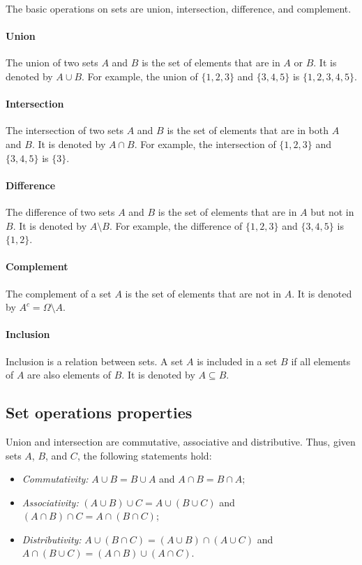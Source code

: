 The basic operations on sets are union, intersection, difference, and complement.

\paragraph{Union}  The union of two sets $A$ and $B$ is the set of elements that are in
$A$ or $B$.  It is denoted by $A \cup B$.  For example, the union of $\{1, 2, 3\}$ and
$\{3, 4, 5\}$ is $\{1, 2, 3, 4, 5\}$.

\paragraph{Intersection}  The intersection of two sets $A$ and $B$ is the set of elements
that are in both $A$ and $B$.  It is denoted by $A \cap B$.  For example, the intersection
of $\{1, 2, 3\}$ and $\{3, 4, 5\}$ is $\{3\}$.

\paragraph{Difference}  The difference of two sets $A$ and $B$ is the set of elements
that are in $A$ but not in $B$.  It is denoted by $A \setminus B$.  For example, the
difference of $\{1, 2, 3\}$ and $\{3, 4, 5\}$ is $\{1, 2\}$.

\paragraph{Complement}  The complement of a set $A$ is the set of elements that are not
in $A$.  It is denoted by $A^c = \Omega \setminus A$.

\paragraph{Inclusion}  Inclusion is a relation between sets.  A set $A$ is included in a
set $B$ if all elements of $A$ are also elements of $B$.  It is denoted by $A \subseteq B$.

\subsection{Set operations properties}

Union and intersection are commutative, associative and distributive.  Thus, given sets
$A$, $B$, and $C$, the following statements hold:
\begin{itemize}
  \item \emph{Commutativity:} $A \cup B = B \cup A$ and $A \cap B = B \cap A$;
  \item \emph{Associativity:} $(A \cup B) \cup C = A \cup (B \cup C)$ and $(A \cap B) \cap C = A \cap (B \cap C)$;
  \item \emph{Distributivity:} $A \cup (B \cap C) = (A \cup B) \cap (A \cup C)$ and $A \cap (B \cup C) = (A \cap B) \cup (A \cap C)$.
\end{itemize}

